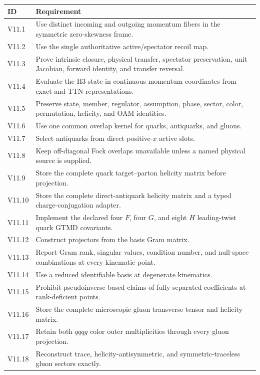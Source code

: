 \documentclass[11pt]{article}
\begin{document}
\begin{longtable}{L{0.13\textwidth}L{0.79\textwidth}}
\toprule
ID & Requirement\\
\midrule
\endhead
V11.1 & Use distinct incoming and outgoing momentum fibers in the symmetric
zero-skewness frame.\\
V11.2 & Use the single authoritative active/spectator recoil map.\\
V11.3 & Prove intrinsic closure, physical transfer, spectator preservation,
unit Jacobian, forward identity, and transfer reversal.\\
V11.4 & Evaluate the H3 state in continuous momentum coordinates from exact
and TTN representations.\\
V11.5 & Preserve state, member, regulator, assumption, phase, sector, color,
permutation, helicity, and OAM identities.\\
V11.6 & Use one common overlap kernel for quarks, antiquarks, and gluons.\\
V11.7 & Select antiquarks from direct positive-\(x\) active slots.\\
V11.8 & Keep off-diagonal Fock overlaps unavailable unless a named physical
source is supplied.\\
V11.9 & Store the complete quark target--parton helicity matrix before
projection.\\
V11.10 & Store the complete direct-antiquark helicity matrix and a typed
charge-conjugation adapter.\\
V11.11 & Implement the declared four \(F\), four \(G\), and eight \(H\)
leading-twist quark GTMD covariants.\\
V11.12 & Construct projectors from the basis Gram matrix.\\
V11.13 & Report Gram rank, singular values, condition number, and null-space
combinations at every kinematic point.\\
V11.14 & Use a reduced identifiable basis at degenerate kinematics.\\
V11.15 & Prohibit pseudoinverse-based claims of fully separated coefficients
at rank-deficient points.\\
V11.16 & Store the complete microscopic gluon transverse tensor and helicity
matrix.\\
V11.17 & Retain both \(qqqg\) color outer multiplicities through every gluon
projection.\\
V11.18 & Reconstruct trace, helicity-antisymmetric, and symmetric-traceless
gluon sectors exactly.\\

\end{longtable}
\end{document}
